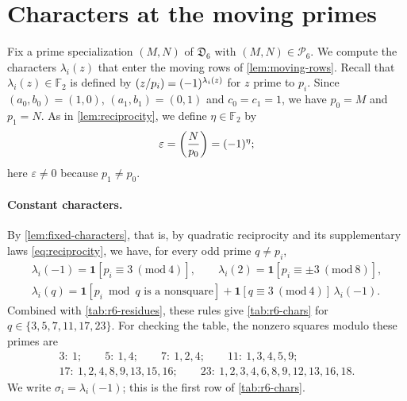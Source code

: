 \documentclass[12pt,oneside,openany]{book}
\theoremstyle{definition}
\theoremstyle{plain}
\numberwithin{equation}{chapter}
\theoremstyle{plain}
\theoremstyle{definition}
\theoremstyle{remark}
\newcommand{\F}{\mathbb F}
\newcommand{\leg}[2]{\mathchoice{\left(\frac{#1}{#2}\right)}{(#1/#2)}{(#1/#2)}{(#1/#2)}}
\newcommand{\datum}{\mathfrak D}
\newcommand{\cP}{\mathcal P}
\newcommand{\eps}{\varepsilon}
\begin{document}
\section{Characters at the moving primes}\label{sec:r6-characters}

Fix a prime specialization $(M,N)$ of $\datum_6$ with $(M,N)\in\cP_6$. We compute the characters $\lambda_i(z)$ that enter the moving rows of \cref{lem:moving-rows}. Recall that $\lambda_i(z)\in\F_2$ is defined by $\leg{z}{p_i}=(-1)^{\lambda_i(z)}$ for $z$ prime to $p_i$. Since $(a_0,b_0)=(1,0)$, $(a_1,b_1)=(0,1)$ and $c_0=c_1=1$, we have $p_0=M$ and $p_1=N$. As in \cref{lem:reciprocity}, we define $\eta\in\F_2$ by
\[
\eps=\leg{N}{p_0}=(-1)^\eta;
\]
here $\eps\ne0$ because $p_1\ne p_0$.

\paragraph{Constant characters.} By \cref{lem:fixed-characters}, that is, by quadratic reciprocity and its supplementary laws \eqref{eq:reciprocity}, we have, for every odd prime $q\ne p_i$,
\begin{equation}\label{r6:const-rule}
\begin{gathered}
\lambda_i(-1)=\mathbf 1[p_i\equiv3\ (\mathrm{mod}\ 4)],\qquad \lambda_i(2)=\mathbf 1[p_i\equiv\pm3\ (\mathrm{mod}\ 8)],\\
\lambda_i(q)=\mathbf 1[p_i\bmod q\text{ is a nonsquare}]+\mathbf 1[q\equiv3\ (\mathrm{mod}\ 4)]\,\lambda_i(-1).
\end{gathered}
\end{equation}
Combined with \cref{tab:r6-residues}, these rules give \cref{tab:r6-chars} for $q\in\{3,5,7,11,17,23\}$. For checking the table, the nonzero squares modulo these primes are
\[
\begin{gathered}
3:\ 1;\qquad 5:\ 1,4;\qquad 7:\ 1,2,4;\qquad 11:\ 1,3,4,5,9;\\
17:\ 1,2,4,8,9,13,15,16;\qquad 23:\ 1,2,3,4,6,8,9,12,13,16,18.
\end{gathered}
\]
We write $\sigma_i=\lambda_i(-1)$; this is the first row of \cref{tab:r6-chars}.
\end{document}

